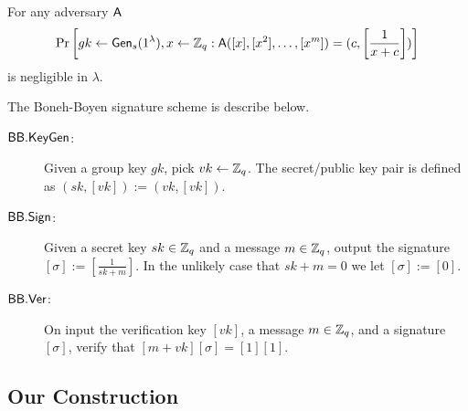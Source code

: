 \begin{definition}
For any adversary $\mathsf{A}$
$$
\Pr\left[gk\gets\mathsf{Gen}_s(1^\lambda),x\gets\mathbb{Z}_q:\mathsf{A}([x],[x^2],\ldots,[x^m])=(c,\left[\frac{1}{x+c}\right])\right]
$$
is negligible in $\lambda$.
\end{definition}

The Boneh-Boyen signature scheme is describe below.

\begin{description}
\item[$\mathsf{BB}.\mathsf{KeyGen}$:] Given a group key $gk$, pick $vk\gets\mathbb{Z}_q$. The secret/public key pair is defined as $(sk,[vk]):=(vk,[vk])$.
\item[$\mathsf{BB}.\mathsf{Sign}$:] Given a secret key $sk\in\mathbb{Z}_q$ and a message $m\in\mathbb{Z}_q$, output the signature $[\sigma]:=\left[\frac{1}{sk+m}\right]$. In the unlikely case that $sk+m=0$ we let $[\sigma]:=[0]$.
\item[$\mathsf{BB}.\mathsf{Ver}$:] On input the verification key $[vk]$, a message $m\in\mathbb{Z}_q$, and a signature $[\sigma]$, verify that $[m+vk][\sigma]=[1][1]$.
\end{description} 

\subsection{Our Construction}

